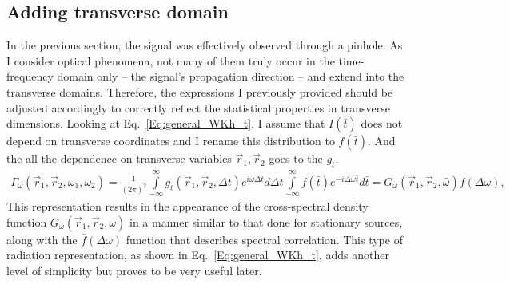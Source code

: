 \subsection{Adding transverse domain}
    In the previous section, the signal was effectively observed through a pinhole. As I consider optical phenomena, not many of them truly occur in the time-frequency domain only -- the signal's propagation direction -- and extend into the transverse domains. Therefore, the expressions I previously provided should be adjusted accordingly to correctly reflect the statistical properties in transverse dimensions.
    Looking at Eq.~\ref{Eq:general_WKh_t}, I assume that $I(\bar{t})$ does not depend on transverse coordinates and I rename this distribution to $f(\bar{t})$. And the all the dependence on transverse variables $\vec{r}_1, \vec{r}_2$ goes to the $g_t$.
    \begin{align}
        \Gamma_{\omega}(\vec{r}_1, \vec{r}_2, \omega_1, \omega_2) = \frac{1}{(2 \pi)^2} \int \limits_{-\infty}^{\infty}  g_t(\vec{r}_1, \vec{r}_2, \Delta t) e^{i \bar{\omega} \Delta t} d \Delta t  \int \limits_{-\infty}^{\infty} f(\bar{t}) e^{-i \Delta \omega \bar{t}} d\bar{t} = G_{\omega}(\vec{r}_1, \vec{r}_2, \bar{\omega})\bar{f}(\Delta \omega),
        \label{Eq:general_WKh_t}
    \end{align}    
    This representation results in the appearance of the cross-spectral density function $G_{\omega}(\vec{r}_1, \vec{r}_2, \bar{\omega})$ in a manner similar to that done for stationary sources, along with the $\bar{f}(\Delta \omega)$ function that describes spectral correlation.  This type of radiation representation, as shown in Eq.~\ref{Eq:general_WKh_t}, adds another level of simplicity but proves to be very useful later.

